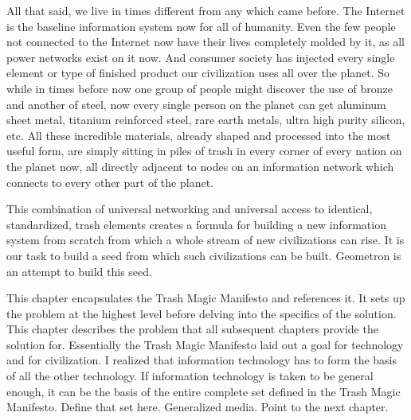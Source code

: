 All that said, we live in times different from any which came before.
The Internet is the baseline information system now for all of humanity.
Even the few people not connected to the Internet now have their lives
completely molded by it, as all power networks exist on it now. And
consumer society has injected every single element or type of finished
product our civilization uses all over the planet. So while in times
before now one group of people might discover the use of bronze and
another of steel, now every single person on the planet can get aluminum
sheet metal, titanium reinforced steel, rare earth metals, ultra high
purity silicon, etc. All these incredible materials, already shaped and
processed into the most useful form, are simply sitting in piles of
trash in every corner of every nation on the planet now, all directly
adjacent to nodes on an information network which connects to every
other part of the planet.

This combination of universal networking and universal access to
identical, standardized, trash elements creates a formula for building a
new information system from scratch from which a whole stream of new
civilizations can rise. It is our task to build a seed from which such
civilizations can be built. Geometron is an attempt to build this seed.

This chapter encapsulates the Trash Magic Manifesto and references it.  It sets up the problem at the highest level before delving into the specifics of the solution.  This chapter describes the problem that all subsequent chapters provide the solution for.  Essentially the Trash Magic Manifesto laid out a goal for technology and for civilization.  I realized that information technology has to form the basis of all the other technology.  If information technology is taken to be general enough, it can be the basis of the entire complete set defined in the Trash Magic Manifesto.  Define that set here.  Generalized media. Point to the next chapter.